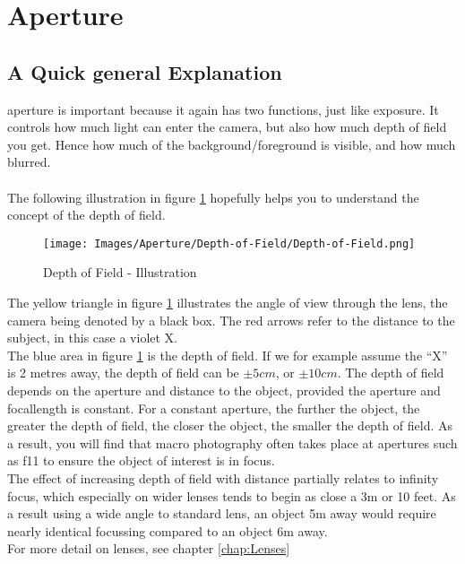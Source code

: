 \section{Aperture}
\label{sec:Aperture}

\subsection{A Quick general Explanation}

\Gls{aperture} is important because it again has two functions, just like \gls{exposure}. It controls how much light can enter the camera, but also how much depth of field you get. Hence how much of the background/foreground is visible, and how much blurred.
\\
\\
The following illustration in figure \ref{fig:Depth-of-Field} hopefully helps you to understand the concept of the depth of field.

\begin{figure}[htbp]
	\centering
		\texttt{[image: Images/Aperture/Depth-of-Field/Depth-of-Field.png]}
	\caption{Depth of Field - Illustration}
	\label{fig:Depth-of-Field}
\end{figure}

The yellow triangle in figure \ref{fig:Depth-of-Field} illustrates the angle of view through the lens, the camera being denoted by a black box. The red arrows refer to the distance to the subject, in this case a violet X.
\\
The blue area in figure \ref{fig:Depth-of-Field} is the depth of field. If we for example assume the ``X'' is 2 metres away, the depth of field can be $\pm5cm$, or $\pm10cm$. The depth of field depends on the \gls{aperture} and distance to the object, provided the \gls{aperture} and \gls{focallength} is constant. For a constant \gls{aperture}, the further the object, the greater the depth of field, the closer the object, the smaller the depth of field. As a result, you will find that macro photography often takes place at \glspl{aperture} such as f11 to ensure the object of interest is in focus.
\\
The effect of increasing depth of field with distance partially relates to infinity focus, which especially on wider lenses tends to begin as close a 3m or 10 feet. As a result using a wide angle to standard lens, an object 5m away would require nearly identical focussing compared to an object 6m away.
\\
For more detail on lenses, see chapter \ref{chap:Lenses}

